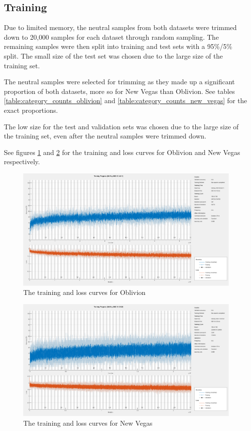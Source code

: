 \documentclass[journal]{IEEEtran}
\begin{document}
\subsection{Training}
Due to limited memory, the neutral samples from both datasets were trimmed down to 20,000
samples for each dataset through random sampling. The remaining samples were then split into training and test sets
with a 95\%/5\% split. The small size of the test set was chosen due to the large size of the training set.

The neutral samples were selected for trimming as they made up a significant proportion of both
datasets, more so for New Vegas than Oblivion. See tables \ref{table:category_counts_oblivion}
and \ref{table:category_counts_new_vegas} for the exact proportions.

The low size for the test and validation sets was chosen due to the large size of the training set,
even after the neutral samples were trimmed down.

See figures \ref{fig:training_ob} and \ref{fig:training_nv} for the training and loss curves for
Oblivion and New Vegas respectively.

\begin{figure}
    \includegraphics[width=\columnwidth]{src/out/training_ob.png}
    \caption{The training and loss curves for Oblivion}
    \label{fig:training_ob}
\end{figure}

\begin{figure}
    \includegraphics[width=\columnwidth]{src/out/training_nv.png}
    \caption{The training and loss curves for New Vegas}
    \label{fig:training_nv}
\end{figure}
\end{document}

